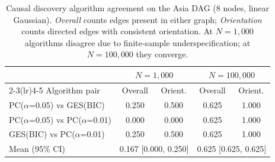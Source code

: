 \begin{table}[ht]
\centering
\caption{Causal discovery algorithm agreement on the Asia DAG (8 nodes, linear Gaussian). \emph{Overall} counts edges present in either graph; \emph{Orientation} counts directed edges with consistent orientation. At $N=1{,}000$ algorithms disagree due to finite-sample underspecification; at $N=100{,}000$ they converge.}
\label{tab:causal_discovery_agreement}
\begin{tabular}{lcccc}
\toprule
 & \multicolumn{2}{c}{$N=1{,}000$} & \multicolumn{2}{c}{$N=100{,}000$} \\
\cmidrule(lr){2-3}\cmidrule(lr){4-5}
Algorithm pair & Overall & Orient. & Overall & Orient. \\
\midrule
PC($\alpha$=0.05) vs GES(BIC) & 0.250 & 0.500 & 0.625 & 1.000 \\
PC($\alpha$=0.05) vs PC($\alpha$=0.01) & 0.000 & 0.000 & 0.625 & 1.000 \\
GES(BIC) vs PC($\alpha$=0.01) & 0.250 & 0.500 & 0.625 & 1.000 \\
\midrule
Mean (95\% CI) & \multicolumn{2}{c}{0.167 [0.000, 0.250]} & \multicolumn{2}{c}{0.625 [0.625, 0.625]} \\
\bottomrule
\end{tabular}
\end{table}
